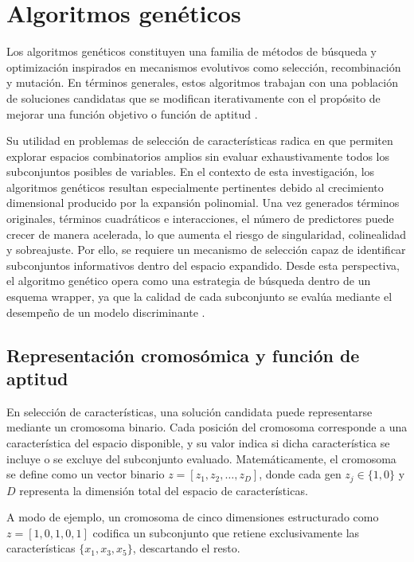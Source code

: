 \section{Algoritmos genéticos}

Los algoritmos genéticos constituyen una familia de métodos de búsqueda y optimización inspirados en mecanismos evolutivos como selección, recombinación y mutación. En términos generales, estos algoritmos trabajan con una población de soluciones candidatas que se modifican iterativamente con el propósito de mejorar una función objetivo o función de aptitud \cite{Sastry2014Genetic}.

Su utilidad en problemas de selección de características radica en que permiten explorar espacios combinatorios amplios sin evaluar exhaustivamente todos los subconjuntos posibles de variables. En el contexto de esta investigación, los algoritmos genéticos resultan especialmente pertinentes debido al crecimiento dimensional producido por la expansión polinomial. Una vez generados términos originales, términos cuadráticos e interacciones, el número de predictores puede crecer de manera acelerada, lo que aumenta el riesgo de singularidad, colinealidad y sobreajuste. Por ello, se requiere un mecanismo de selección capaz de identificar subconjuntos informativos dentro del espacio expandido. Desde esta perspectiva, el algoritmo genético opera como una estrategia de búsqueda dentro de un esquema wrapper, ya que la calidad de cada subconjunto se evalúa mediante el desempeño de un modelo discriminante \cite{kohavi1997wrappers}.

\subsection{Representación cromosómica y función de aptitud}

En selección de características, una solución candidata puede representarse mediante un cromosoma binario. Cada posición del cromosoma corresponde a una característica del espacio disponible, y su valor indica si dicha característica se incluye o se excluye del subconjunto evaluado. Matemáticamente, el cromosoma se define como un vector binario $z = [z_1,z_2,\dots,z_D]$, donde cada gen $z_j \in \{1,0\}$ y $D$ representa la dimensión total del espacio de características.

A modo de ejemplo, un cromosoma de cinco dimensiones estructurado como $z = [1,0,1,0,1]$ codifica un subconjunto que retiene exclusivamente las características $\{x_1,x_3,x_5\}$, descartando el resto.

